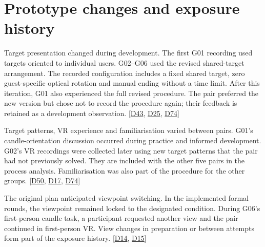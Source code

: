 \section{Prototype changes and exposure history}\label{sec:3-3}

Target presentation changed during development. The first G01 recording used targets oriented to individual users. G02--G06 used the revised shared-target arrangement. The recorded configuration includes a fixed shared target, zero guest-specific optical rotation and manual ending without a time limit. After this iteration, G01 also experienced the full revised procedure. The pair preferred the new version but chose not to record the procedure again; their feedback is retained as a development observation. [\hyperlink{src:D43}{D43}, \hyperlink{src:D25}{D25}, \hyperlink{src:D74}{D74}]

Target patterns, VR experience and familiarisation varied between pairs. G01's candle-orientation discussion occurred during practice and informed development. G02's VR recordings were collected later using new target patterns that the pair had not previously solved. They are included with the other five pairs in the process analysis. Familiarisation was also part of the procedure for the other groups. [\hyperlink{src:D50}{D50}, \hyperlink{src:D17}{D17}, \hyperlink{src:D74}{D74}]

The original plan anticipated viewpoint switching. In the implemented formal rounds, the viewpoint remained locked to the designated condition. During G06's first-person candle task, a participant requested another view and the pair continued in first-person VR. View changes in preparation or between attempts form part of the exposure history. [\hyperlink{src:D14}{D14}, \hyperlink{src:D15}{D15}]


